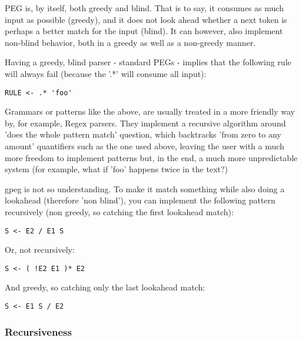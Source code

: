 PEG is, by itself, both greedy and blind.
That is to say, it consumes as much input as possible (greedy), and it does not
look ahead whether a next token is perhaps a better match for the input (blind).
It can however, also implement non-blind behavior, both in a greedy as
well as a non-greedy manner.

Having a greedy, blind parser - standard PEGs - implies that the following
rule will always fail (because the '.*' will consume all input):

\begin{myquote}
\begin{verbatim}
RULE <- .* 'foo'
\end{verbatim}
\end{myquote}

Grammars or patterns like the above, are usually treated in a more
friendly way by, for example, Regex parsers. They implement
a recursive algorithm around 'does the whole pattern match' question,
which backtracks 'from zero to any amount' quantifiers such as the one
used above,
leaving the user with a much more freedom to implement patterns but,
in the end, a much more unpredictable system (for example, what if
'foo' happens twice in the text?)

gpeg is not so understanding. To make it match something while
also doing a lookahead (therefore 'non blind'),
you can implement the following pattern
recursively (non greedy, so catching the first lookahead match):

\begin{myquote}
\begin{verbatim}
S <- E2 / E1 S
\end{verbatim}
\end{myquote}

Or, not recursively:

\begin{myquote}
\begin{verbatim}
S <- ( !E2 E1 )* E2
\end{verbatim}
\end{myquote}

And greedy, so catching only the last lookahead match:

\begin{myquote}
\begin{verbatim}
S <- E1 S / E2
\end{verbatim}
\end{myquote}

\subsubsection{Recursiveness}

